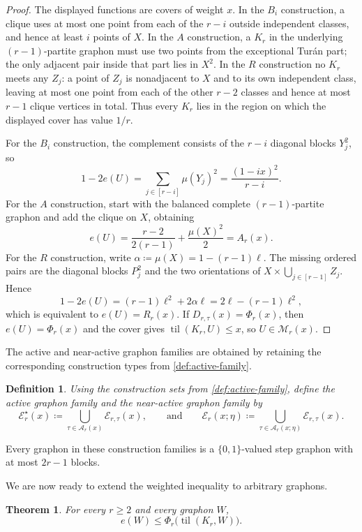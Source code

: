 \documentclass[10pt]{article}
\numberwithin{equation}{section}
\newtheorem{theorem}{Theorem}[section]
\newtheorem{definition}[definition]{Definition}
\newcommand{\til}{\operatorname{til}}
\newcommand{\cA}{\mathcal A}
\newcommand{\cE}{\mathcal E}
\newcommand{\cM}{\mathcal M}
\begin{document}
\begin{proof}
The displayed functions are covers of weight $x$.  In the $B_i$ construction, a clique uses at most one point from each of the $r-i$ outside independent classes, and hence at least $i$ points of $X$.  In the $A$ construction, a $K_r$ in the underlying $(r-1)$-partite graphon must use two points from the exceptional Tur\'an part; the only adjacent pair inside that part lies in $X^2$.  In the $R$ construction no $K_r$ meets any $Z_j$: a point of $Z_j$ is nonadjacent to $X$ and to its own independent class, leaving at most one point from each of the other $r-2$ classes and hence at most $r-1$ clique vertices in total.  Thus every $K_r$ lies in the region on which the displayed cover has value $1/r$.

For the $B_i$ construction, the complement consists of the $r-i$ diagonal blocks $Y_j^2$, so
\[
 1-2e(U)=\sum_{j\in[r-i]}\mu(Y_j)^2
 =\frac{(1-ix)^2}{r-i}.
\]
For the $A$ construction, start with the balanced complete $(r-1)$-partite graphon and add the clique on $X$, obtaining
\[
 e(U)=\frac{r-2}{2(r-1)}+\frac{\mu(X)^2}{2}=A_r(x).
\]
For the $R$ construction, write $\alpha\coloneqq\mu(X)=1-(r-1)\ell$.  The missing ordered pairs are the diagonal blocks $P_j^2$ and the two orientations of $X\times\bigcup_{j\in[r-1]}Z_j$.  Hence
\[
 1-2e(U)=(r-1)\ell^2+2\alpha\ell
 =2\ell-(r-1)\ell^2,
\]
which is equivalent to $e(U)=R_r(x)$.  If $D_{r,\tau}(x)=\Phi_r(x)$, then $e(U)=\Phi_r(x)$ and the cover gives $\til(K_r,U)\le x$, so $U\in\cM_r(x)$.
\end{proof}

The active and near-active graphon families are obtained by retaining the corresponding construction types from \cref{def:active-family}.

\begin{definition}\label{def:active-graphon-family}
Using the construction sets from \cref{def:active-family}, define the \emph{active graphon family} and the \emph{near-active graphon family} by
\[
 \cE_r^\star(x)\coloneqq\bigcup_{\tau\in\cA_r(x)}\cE_{r,\tau}(x),
 \qquad\text{and}\qquad
 \cE_r(x;\eta)\coloneqq\bigcup_{\tau\in\cA_r(x;\eta)}\cE_{r,\tau}(x).
\]
\end{definition}

Every graphon in these construction families is a $\{0,1\}$-valued step graphon with at most $2r-1$ blocks.

We are now ready to extend the weighted inequality to arbitrary graphons.

\begin{theorem}\label{thm:graphon-density}
For every $r\ge2$ and every graphon $W$,
\begin{equation}\label{eq:graphon-density-input}
 e(W)\le \Phi_r\bigl(\til(K_r,W)\bigr).
\end{equation}
\end{theorem}
\end{document}
